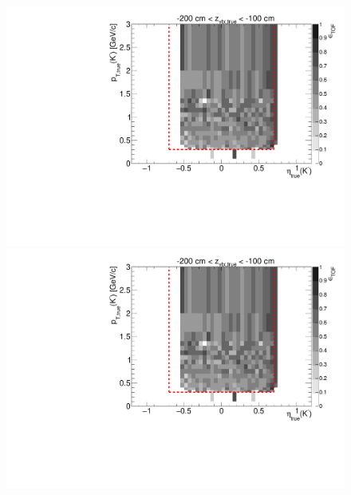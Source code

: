 \begin{figure}[hb]
{  \includegraphics[width=\linewidth,page=16]{graphics/eff/Eff2D_TOF_kaon_Minus.pdf}\\
  \includegraphics[width=\linewidth,page=18]{graphics/eff/Eff2D_TOF_kaon_Minus.pdf}
}%
\end{figure}


